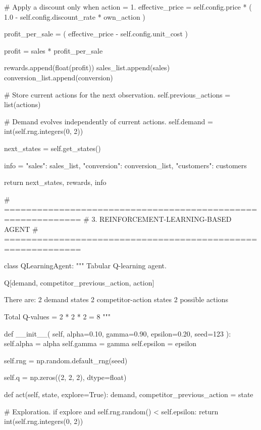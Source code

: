             # Apply a discount only when action = 1.
            effective_price = self.config.price * (
                1.0 - self.config.discount_rate * own_action
            )

            profit_per_sale = (
                effective_price - self.config.unit_cost
            )

            profit = sales * profit_per_sale

            rewards.append(float(profit))
            sales_list.append(sales)
            conversion_list.append(conversion)

        # Store current actions for the next observation.
        self.previous_actions = list(actions)

        # Demand evolves independently of current actions.
        self.demand = int(self.rng.integers(0, 2))

        next_states = self.get_states()

        info = {
            "sales": sales_list,
            "conversion": conversion_list,
            "customers": customers
        }

        return next_states, rewards, info


# ============================================================
# 3. REINFORCEMENT-LEARNING-BASED AGENT
# ============================================================

class QLearningAgent:
    """
    Tabular Q-learning agent.

    Q[demand, competitor_previous_action, action]

    There are:
        2 demand states
        2 competitor-action states
        2 possible actions

    Total Q-values = 2 * 2 * 2 = 8
    """

    def __init__(
        self,
        alpha=0.10,
        gamma=0.90,
        epsilon=0.20,
        seed=123
    ):
        self.alpha = alpha
        self.gamma = gamma
        self.epsilon = epsilon

        self.rng = np.random.default_rng(seed)

        self.q = np.zeros((2, 2, 2), dtype=float)

    def act(self, state, explore=True):
        demand, competitor_previous_action = state

        # Exploration.
        if explore and self.rng.random() < self.epsilon:
            return int(self.rng.integers(0, 2))

